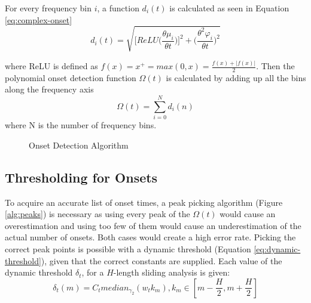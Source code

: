 \documentclass[a4paper,12pt]{report}
\begin{document}
For every frequency bin $i$, a function $d_i(t)$ is calculated as seen in Equation \ref{eq:complex-onset}
\begin{equation}
\label{eq:complex-onset}
d_i(t) = \sqrt{ \Bigg[ ReLU \Bigg( \frac{\theta \mu_i}{\theta t} \Bigg) \Bigg] ^2
+ \Bigg( \frac{\theta ^2 \varphi_i}{\theta t} \Bigg)^2}
\end{equation}

where ReLU is defined as $f(x) = x^+ = max(0,x) = \frac{f(x)+|f(x)|}{2}$. Then the polynomial onset detection function $\Omega(t)$ is calculated by adding up all the 
bins along the frequency axis
\begin{equation}
\Omega(t) = \displaystyle\sum_{i=0}^{N} d_i(n)
\end{equation}
where N is the number of frequency bins.

\begin{figure}[htbp]
\begin{center}
\end{center}
\caption[Onset Detection Algorithm]{Onset Detection Algorithm}
\label{alg:onset}
\end{figure}

\subsection{Thresholding for Onsets}
To acquire an accurate list of onset times, a peak picking algorithm (Figure \ref{alg:peaks}) is necessary as using
every peak of the $\Omega(t)$ would cause an overestimation and using too few of them would
cause an underestimation of the actual number of onsets. Both cases would create a high error 
rate. Picking the correct peak points is possible with a dynamic threshold \cite{paper:1} (Equation 
\ref{eq:dynamic-threshold}), given that the correct constants are supplied. Each value of the dynamic threshold $\delta_t$, for a $H$-length sliding analysis is given:
\begin{equation}
\label{eq:dynamic-threshold}
\delta_t(m) = C_t median_{\gamma_2}(w_t k_m), k_m\in \left[m-\frac{H}{2}, m+\frac{H}{2} \right] 
\end{equation}
\end{document}
